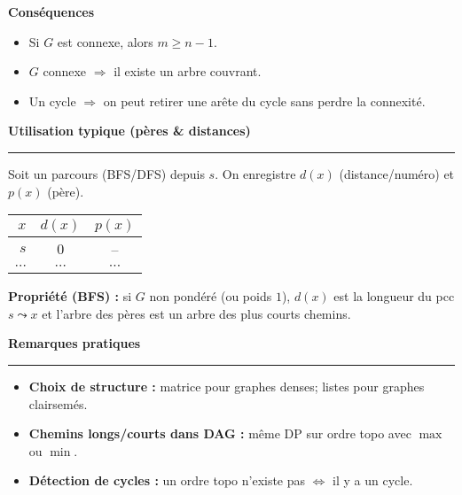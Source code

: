 \documentclass[9pt,a4paper]{article}
\newcommand{\sect}[1]{\vspace{1ex}\textbf{\large #1}\par\vspace{0.3ex}\hrule\vspace{0.6ex}}
\newcommand{\subsect}[1]{\vspace{0.4ex}\textbf{#1}\par}
\begin{document}
\begin{multicols}{3}
    \subsect{Conséquences}
    \begin{itemize}
        \item Si $G$ est connexe, alors $m\ge n-1$.
        \item $G$ connexe $\Rightarrow$ il existe un arbre couvrant.
        \item Un cycle $\Rightarrow$ on peut retirer une arête du cycle sans perdre la connexité.
    \end{itemize}

    \sect{Utilisation typique (pères \& distances)}
    Soit un parcours (BFS/DFS) depuis $s$. On enregistre $d(x)$ (distance/numéro) et $p(x)$ (père).
    \begin{center}
        \begin{tabular}{r|c|c}
            $x$      & $d(x)$   & $p(x)$   \\\hline
            $s$      & $0$      & --       \\
            $\cdots$ & $\cdots$ & $\cdots$
        \end{tabular}
    \end{center}
    \textbf{Propriété (BFS) :} si $G$ non pondéré (ou poids $1$), $d(x)$ est la longueur du pcc $s\leadsto x$ et l’arbre des pères est un arbre des plus courts chemins.

    \sect{Remarques pratiques}
    \begin{itemize}
        \item \textbf{Choix de structure :} matrice pour graphes denses; listes pour graphes clairsemés.
        \item \textbf{Chemins longs/courts dans DAG :} même DP sur ordre topo avec $\max$ ou $\min$.
        \item \textbf{Détection de cycles :} un ordre topo n’existe pas $\Leftrightarrow$ il y a un cycle.
    \end{itemize}

\end{multicols}
\end{document}
